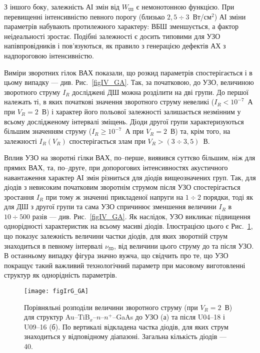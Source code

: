 \documentclass[a4paper,14pt,oneside,openany]{memoir}
\begin{document}
З іншого боку, залежність АІ змін від $W_\mathtt{US}$ є немонотонною функцією.
При перевищенні інтенсивністю певного порогу (близько $2,5\div3$~Вт/см$^2$) АІ зміни параметрів набувають
протилежного характеру:  ВБШ зменшується, а фактор неідеальності зростає.
Подібні залежності є досить типовими для УЗО напівпровідників \cite{Zdeb1989,Zaver,Zaver2005}
і пов'язуються, як правило з генерацією дефектів АХ з надпороговою інтенсивністю.



Виміри зворотних гілок ВАХ показали, що розкид параметрів спостерігається і в цьому випадку ---
див. Рис.~\ref{figIV_GA}.
Так, за початковою, до УЗО, величиною зворотного струму $I_R$ досліджені ДШ можна розділити на дві групи.
До першої належать ті, в яких початкові значення зворотного струму невеликі ($I_R<10^{-7}$~А
при $V_R=2$~В) і характер його
польової залежності залишається незмінним у всьому дослідженому інтервалі зміщень.
Діоди другої групи характеризуються більшим значенням струму ($I_R\geq10^{-7}$~А при $V_R=2$~В) та, крім того, на залежності $I_R(V_R)$ спостерігається злам при $V_R>(3\div3,5)$~В.


Вплив УЗО на зворотні гілки ВАХ, по--перше, виявився суттєво більшим, ніж для прямих ВАХ, та, по--друге,
при допорогових інтенсивностях акустичного навантаження характер АІ змін різниться для діодів вищеозначених груп.
Так, для діодів з невисоким початковим зворотнім струмом після УЗО спостерігається зростання $I_R$ при тому ж значенні прикладеної напруги на $1\div2$ порядки,
тоді як для ДШ з другої групи та сама УЗО спричинює зменшення величини $I_R$ в $10\div500$ разів --- див. Рис.~\ref{figIV_GA}.
Як наслідок, УЗО викликає підвищення однорідності характеристик на всьому масиві діодів.
Ілюстрацією цього є Рис.~\ref{figIrG_GA}, що показує залежність величини частки діодів, для яких зворотній струм знаходиться в певному інтервалі $\nu_\mathtt{SD}$,
від величини цього струму до та після УЗО.
В останньому випадку фігура значно вужча, що свідчить про те, що УЗО покращує такий важливий технологічний параметр при масовому виготовленні структур як однорідність параметрів.

\begin{figure}
\center
\texttt{[image: figIrG\_GA]}%
\caption{\label{figIrG_GA}
Порівняльні розподіли величини зворотного струму (при $V_R=2$~В)
для структур Au--TiB$_x$--$n$--$n^+$--GaAs до УЗО (а) та після U04--18 і U09--16 (б).
По вертикалі відкладена частка діодів, для яких струм знаходиться у відповідному діапазоні.
Загальна кількість діодів --- 40.
}
\end{figure}
\end{document}
